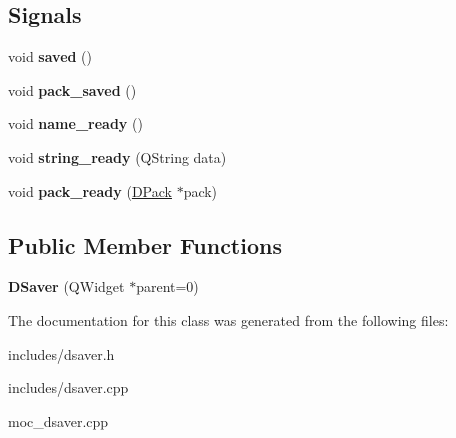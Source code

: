 \subsection*{Signals}
\begin{DoxyCompactItemize}
\item 
\hypertarget{class_d_saver_ab785328826b004cb1b154a7452ce97a6}{
void {\bfseries saved} ()}
\label{class_d_saver_ab785328826b004cb1b154a7452ce97a6}

\item 
\hypertarget{class_d_saver_ac9fab0ee262742f0384df57631857a9f}{
void {\bfseries pack\_\-saved} ()}
\label{class_d_saver_ac9fab0ee262742f0384df57631857a9f}

\item 
\hypertarget{class_d_saver_ad828f0f14506fb5781f5a041fd378026}{
void {\bfseries name\_\-ready} ()}
\label{class_d_saver_ad828f0f14506fb5781f5a041fd378026}

\item 
\hypertarget{class_d_saver_a07788a99447703a36fdb1a78526b19b8}{
void {\bfseries string\_\-ready} (QString data)}
\label{class_d_saver_a07788a99447703a36fdb1a78526b19b8}

\item 
\hypertarget{class_d_saver_a3aab9fd72dbbd8629903276a00873b32}{
void {\bfseries pack\_\-ready} (\hyperlink{struct_d_pack}{DPack} $\ast$pack)}
\label{class_d_saver_a3aab9fd72dbbd8629903276a00873b32}

\end{DoxyCompactItemize}
\subsection*{Public Member Functions}
\begin{DoxyCompactItemize}
\item 
\hypertarget{class_d_saver_a1e80a72ab0d279c56774e426904ce98d}{
{\bfseries DSaver} (QWidget $\ast$parent=0)}
\label{class_d_saver_a1e80a72ab0d279c56774e426904ce98d}

\end{DoxyCompactItemize}


The documentation for this class was generated from the following files:\begin{DoxyCompactItemize}
\item 
includes/dsaver.h\item 
includes/dsaver.cpp\item 
moc\_\-dsaver.cpp\end{DoxyCompactItemize}
